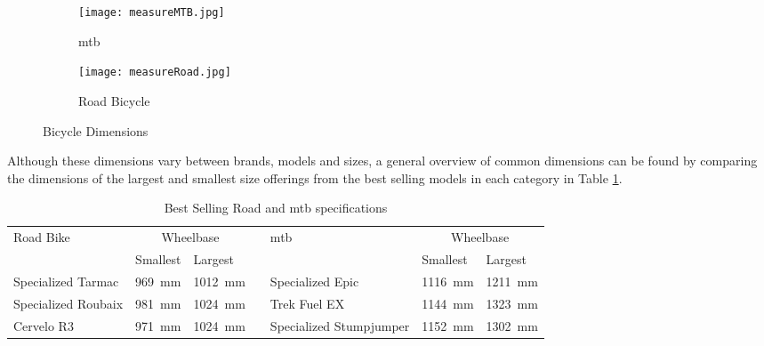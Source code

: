 \begin{figure}[H]
	\centering
	\begin{subfigure}{.5\textwidth}
		\centering
		\texttt{[image: measureMTB.jpg]}
		\caption{\ac{mtb} \citep[model by:][]{Pratama:2021}}
		\label{fig:sub1}
	\end{subfigure}%
	\begin{subfigure}{.5\textwidth}
		\centering
		\texttt{[image: measureRoad.jpg]}
		\caption{Road Bicycle \citep[model by:][]{Morozev:2017}}
		\label{fig:sub2}
	\end{subfigure}
	\caption{Bicycle Dimensions}
	\label{fig:bikeDim}
\end{figure}

\vspace{-0.6 cm}

Although these dimensions vary between brands, models and sizes, a general overview of common dimensions can be found by comparing the dimensions of the largest and smallest size offerings from the best selling models in each category in Table \ref{tab:bikes}. \citep{Lin:2021} 

\begin{table}[H]
	\renewcommand{\arraystretch}{\tablestretch}
	\centering
	\caption{Best Selling Road and \ac{mtb} specifications}
	\citep{Geometry:2022}
	\begin{tabularx}{\textwidth}{p{2.6cm} X Xp{0.05cm} p{2.6cm} X X}
		\toprule
		Road Bike           & \multicolumn{2}{c}{Wheelbase} &                         & \ac{mtb} & \multicolumn{2}{c}{Wheelbase}                                                     \\
		                    & Smallest                      & Largest                 &          &                               & Smallest                & Largest                 \\
		\midrule
		Specialized Tarmac  & \SI{969}{\milli\meter}        & \SI{1012}{\milli\meter} &          & Specialized Epic              & \SI{1116}{\milli\meter} & \SI{1211}{\milli\meter} \\
		Specialized Roubaix & \SI{981}{\milli\meter}        & \SI{1024}{\milli\meter} &          & Trek Fuel EX                  & \SI{1144}{\milli\meter} & \SI{1323}{\milli\meter} \\
		Cervelo R3          & \SI{971}{\milli\meter}        & \SI{1024}{\milli\meter} &          & Specialized Stumpjumper       & \SI{1152}{\milli\meter} & \SI{1302}{\milli\meter} \\
		\bottomrule
	\end{tabularx}
	\label{tab:bikes}
\end{table}

